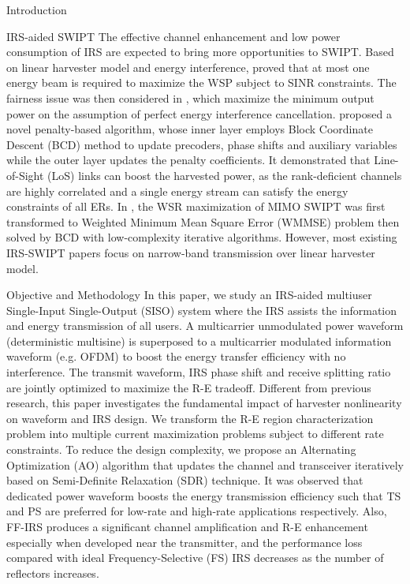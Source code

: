 \documentclass{IEEEtran}
\begin{document}
\begin{section}{Introduction}
	\begin{subsection}{IRS-aided SWIPT}
		The effective channel enhancement and low power consumption of IRS are expected to bring more opportunities to SWIPT. Based on linear harvester model and energy interference, \cite{Wu2019b} proved that at most one energy beam is required to maximize the WSP subject to SINR constraints. The fairness issue was then considered in \cite{Tang2019}, which maximize the minimum output power on the assumption of perfect energy interference cancellation. \cite{Wu2019c} proposed a novel penalty-based algorithm, whose inner layer employs Block Coordinate Descent (BCD) method to update precoders, phase shifts and auxiliary variables while the outer layer updates the penalty coefficients. It demonstrated that Line-of-Sight (LoS) links can boost the harvested power, as the rank-deficient channels are highly correlated and a single energy stream can satisfy the energy constraints of all ERs. In \cite{Pan2019a}, the WSR maximization of MIMO SWIPT was first transformed to Weighted Minimum Mean Square Error (WMMSE) problem then solved by BCD with low-complexity iterative algorithms. However, most existing IRS-SWIPT papers focus on narrow-band transmission over linear harvester model.
	\end{subsection}

	\begin{subsection}{Objective and Methodology}
		In this paper, we study an IRS-aided multiuser Single-Input Single-Output (SISO) system where the IRS assists the information and energy transmission of all users. A multicarrier unmodulated power waveform (deterministic multisine) is superposed to a multicarrier modulated information waveform (e.g. OFDM) to boost the energy transfer efficiency with no interference. The transmit waveform, IRS phase shift and receive splitting ratio are jointly optimized to maximize the R-E tradeoff. Different from previous research, this paper investigates the fundamental impact of harvester nonlinearity on waveform and IRS design. We transform the R-E region characterization problem into multiple current maximization problems subject to different rate constraints. To reduce the design complexity, we	propose an Alternating Optimization (AO) algorithm that updates the channel and transceiver iteratively based on Semi-Definite Relaxation (SDR) technique. It was observed that dedicated power waveform boosts the energy transmission efficiency such that TS and PS are preferred for low-rate and high-rate applications respectively. Also, FF-IRS produces a significant channel amplification and R-E enhancement especially when developed near the transmitter, and the performance loss compared with ideal Frequency-Selective (FS) IRS decreases as the number of reflectors increases.
	\end{subsection}
\end{section}
\end{document}
